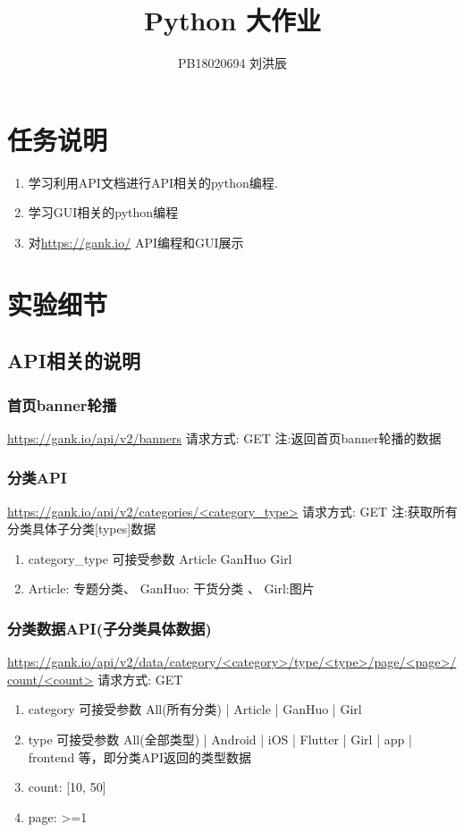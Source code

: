 \documentclass[12pt,a4paper,UTF8]{ctexart}
\title{Python 大作业}
\author{PB18020694 刘洪辰}
\date{}
\begin{document}
    \maketitle
    \section{任务说明}
    \begin{enumerate}
        \item 学习利用API文档进行API相关的python编程.
        \item 学习GUI相关的python编程
        \item 对\url{https://gank.io/} API编程和GUI展示
    \end{enumerate}
    \section{实验细节}
    \subsection{API相关的说明}
    \subsubsection{首页banner轮播}
    \url{https://gank.io/api/v2/banners} 请求方式: GET
    注:返回首页banner轮播的数据
    \subsubsection{分类API}
    \url{https://gank.io/api/v2/categories/<category_type>} 请求方式: GET
    注:获取所有分类具体子分类[types]数据
    \begin{enumerate}
        \item category\_type 可接受参数 Article \textbar GanHuo \textbar Girl
        \item Article: 专题分类、 GanHuo: 干货分类 、 Girl:图片
    \end{enumerate}
    \subsubsection{分类数据API(子分类具体数据)}
    \url{https://gank.io/api/v2/data/category/<category>/type/<type>/page/<page>/count/<count>}
    请求方式: GET
    \begin{enumerate}
        \item category 可接受参数 All(所有分类) | Article | GanHuo | Girl
        \item type 可接受参数 All(全部类型) | Android | iOS | Flutter | Girl | app | frontend 等，即分类API返回的类型数据
        \item count: [10, 50]
        \item page: >=1
    \end{enumerate}
\end{document}
